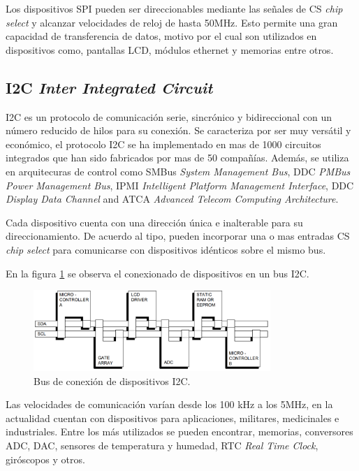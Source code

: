 Los dispositivos SPI pueden ser direccionables mediante las señales de CS \textit{chip select} y alcanzar velocidades de reloj de hasta 50MHz. Esto permite una gran capacidad de transferencia de datos, motivo por el cual son utilizados en dispositivos como, pantallas LCD, módulos ethernet y memorias entre otros. 


\subsection{I2C \textit{Inter Integrated Circuit}}

I2C es un protocolo de comunicación serie, sincrónico y bidireccional con un número reducido de hilos para su conexión. Se caracteriza por ser muy versátil y económico, el protocolo I2C se ha implementado en mas de 1000 circuitos integrados que han sido fabricados por mas de 50 compañías. Además, se utiliza en arquitecuras de control como SMBus   \textit{System Management Bus}, DDC    \textit{PMBus Power Management Bus}, IPMI   \textit{Intelligent Platform Management Interface}, DDC   \textit{Display Data Channel} and ATCA   \textit{Advanced Telecom Computing Architecture}.

Cada dispositivo cuenta con una dirección única e inalterable para su direccionamiento. De acuerdo al tipo, pueden incorporar una o mas entradas CS \textit{chip select} para comunicarse con dispositivos idénticos sobre el mismo bus.

En la figura \ref{fig:I2C} se observa el conexionado de dispositivos en un bus I2C.

\begin{figure}[htbp]
	\centering
	\includegraphics[width=0.8\textwidth]{./Figures/I2C.png}
	\caption{Bus de conexión de dispositivos I2C.}
	\label{fig:I2C}
\end{figure} 

Las velocidades de comunicación varían desde los 100 kHz a los 5MHz, en la actualidad cuentan con dispositivos para aplicaciones, militares, medicinales e industriales. Entre los más utilizados se pueden encontrar, memorias, conversores ADC, DAC, sensores de temperatura y humedad, RTC \textit{Real Time Clock}, giróscopos y otros.


